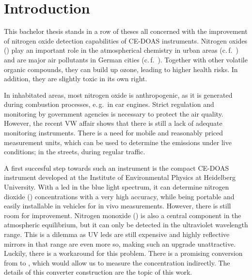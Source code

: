 \section{Introduction}
\label{sec:intro}

This bachelor thesis stands in a row of theses all concerned with the
improvement of nitrogen oxide detection capabilities of CE-DOAS
instruments. Nitrogen oxides () play an important role in the
atmospherical chemistry in urban areas (c.\,f.~\cite{roedel}) and are
major air pollutants in German cities
(c.\,f.~\cite{no2schadstoff,who}). Together with other volatile
organic compounds, they can build up ozone, leading to higher health
risks. In addition, they are slightly toxic in its own right.

In inhabitated areas, most nitrogen oxide is anthropogenic, as it is
generated during combustion processes, e.\,g.\ in car engines. Strict
regulation and monitoring by government agencies is necessary to
protect the air quality. However, the recent VW affair shows that
there is still a lack of adequate monitoring instruments. There is a
need for mobile and reasonably priced measurement units, which can be
used to determine the  emissions under live conditions; in
the streets, during regular traffic.

A first succesful step towards such an instrument is the compact
CE-DOAS instrument developed at the Institute of Environmental Physics
at Heidelberg University. With a led in the blue light spectrum, it
can determine nitrogen dioxide () concentrations with a very
high accuracy, while being portable and easily installable in vehicles
for in vivo measurements. However, there is still room for
improvement. Nitrogen monoxide () is also a central component
in the atmospheric  equilibrium, but it can only be detected
in the ultraviolet wavelength range. This is a dilemma as UV leds are
still expensive and highly reflective mirrors in that range are even
more so, making such an upgrade unattractive. Luckily, there is a
workaround for this problem. There is a promising conversion from
 to , which would allow us to measure the concentration
indirectly. The details of this converter construction are the topic
of this work.

